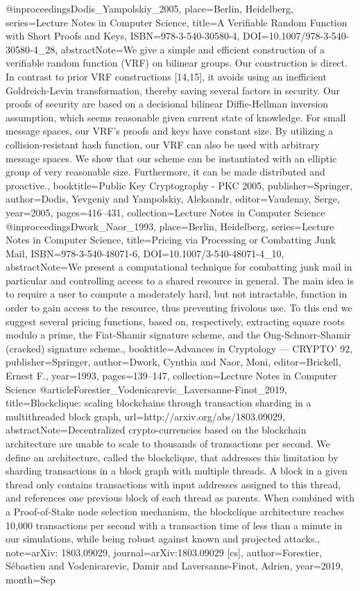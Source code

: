  @inproceedings{Dodis_Yampolskiy_2005, place={Berlin, Heidelberg}, series={Lecture Notes in Computer Science}, title={A Verifiable Random Function with Short Proofs and Keys}, ISBN={978-3-540-30580-4}, DOI={10.1007/978-3-540-30580-4_28}, abstractNote={We give a simple and efficient construction of a verifiable random function (VRF) on bilinear groups. Our construction is direct. In contrast to prior VRF constructions [14,15], it avoids using an inefficient Goldreich-Levin transformation, thereby saving several factors in security. Our proofs of security are based on a decisional bilinear Diffie-Hellman inversion assumption, which seems reasonable given current state of knowledge. For small message spaces, our VRF’s proofs and keys have constant size. By utilizing a collision-resistant hash function, our VRF can also be used with arbitrary message spaces. We show that our scheme can be instantiated with an elliptic group of very reasonable size. Furthermore, it can be made distributed and proactive.}, booktitle={Public Key Cryptography - PKC 2005}, publisher={Springer}, author={Dodis, Yevgeniy and Yampolskiy, Aleksandr}, editor={Vaudenay, Serge}, year={2005}, pages={416–431}, collection={Lecture Notes in Computer Science} }
 @inproceedings{Dwork_Naor_1993, place={Berlin, Heidelberg}, series={Lecture Notes in Computer Science}, title={Pricing via Processing or Combatting Junk Mail}, ISBN={978-3-540-48071-6}, DOI={10.1007/3-540-48071-4_10}, abstractNote={We present a computational technique for combatting junk mail in particular and controlling access to a shared resource in general. The main idea is to require a user to compute a moderately hard, but not intractable, function in order to gain access to the resource, thus preventing frivolous use. To this end we suggest several pricing functions, based on, respectively, extracting square roots modulo a prime, the Fiat-Shamir signature scheme, and the Ong-Schnorr-Shamir (cracked) signature scheme.}, booktitle={Advances in Cryptology — CRYPTO’ 92}, publisher={Springer}, author={Dwork, Cynthia and Naor, Moni}, editor={Brickell, Ernest F.}, year={1993}, pages={139–147}, collection={Lecture Notes in Computer Science} }
 @article{Forestier_Vodenicarevic_Laversanne-Finot_2019, title={Blockclique: scaling blockchains through transaction sharding in a multithreaded block graph}, url={http://arxiv.org/abs/1803.09029}, abstractNote={Decentralized crypto-currencies based on the blockchain architecture are unable to scale to thousands of transactions per second. We deﬁne an architecture, called the blockclique, that addresses this limitation by sharding transactions in a block graph with multiple threads. A block in a given thread only contains transactions with input addresses assigned to this thread, and references one previous block of each thread as parents. When combined with a Proof-of-Stake node selection mechanism, the blockclique architecture reaches 10,000 transactions per second with a transaction time of less than a minute in our simulations, while being robust against known and projected attacks.}, note={arXiv: 1803.09029}, journal={arXiv:1803.09029 [cs]}, author={Forestier, Sébastien and Vodenicarevic, Damir and Laversanne-Finot, Adrien}, year={2019}, month={Sep} }
